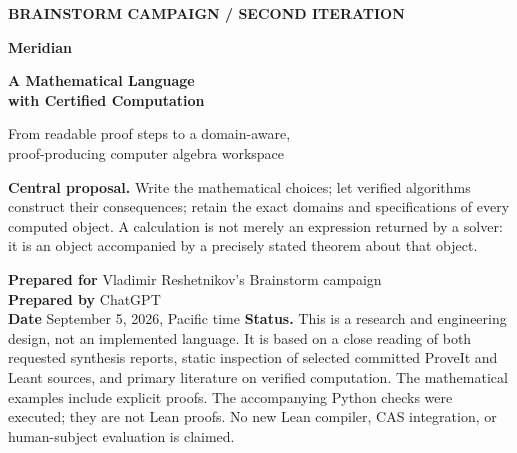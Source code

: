 \documentclass[11pt,a4paper]{article}
\theoremstyle{remark}
\begin{document}
\begin{titlepage}
\vspace*{10mm}
{\small\sffamily\bfseries\color{accent}BRAINSTORM CAMPAIGN \quad / \quad SECOND ITERATION\par}
\vspace{13mm}
{\fontsize{35}{40}\selectfont\bfseries\color{ink}Meridian\par}
\vspace{4mm}
{\LARGE\bfseries A Mathematical Language\\with Certified Computation\par}
\vspace{9mm}
{\large From readable proof steps to a domain-aware,\\proof-producing computer algebra workspace\par}
\vspace{11mm}
\begin{decisionbox}
\textbf{Central proposal.} Write the mathematical choices; let verified algorithms
construct their consequences; retain the exact domains and specifications of every
computed object. A calculation is not merely an expression returned by a solver:
it is an object accompanied by a precisely stated theorem about that object.
\end{decisionbox}
\vspace{8mm}
\textbf{Prepared for} Vladimir Reshetnikov's Brainstorm campaign\\
\textbf{Prepared by} ChatGPT\\
\textbf{Date} September 5, 2026, Pacific time
\vfill
\small
\textbf{Status.} This is a research and engineering design, not an implemented
language. It is based on a close reading of both requested synthesis reports,
static inspection of selected committed ProveIt and Leant sources, and primary
literature on verified computation. The mathematical examples include explicit
proofs. The accompanying Python checks were executed; they are not Lean proofs.
No new Lean compiler, CAS integration, or human-subject evaluation is claimed.
\end{titlepage}
\end{document}
